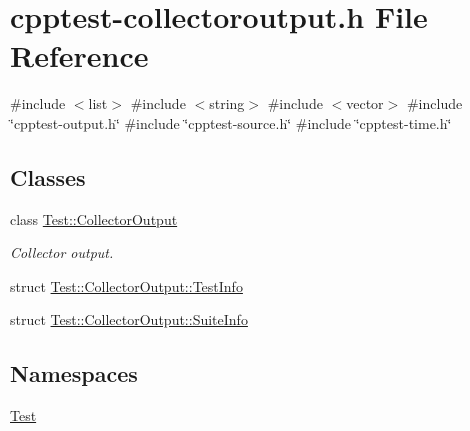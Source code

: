 \hypertarget{cpptest-collectoroutput_8h}{}\section{cpptest-\/collectoroutput.h File Reference}
\label{cpptest-collectoroutput_8h}
{\ttfamily \#include $<$list$>$}\newline
{\ttfamily \#include $<$string$>$}\newline
{\ttfamily \#include $<$vector$>$}\newline
{\ttfamily \#include \char`\"{}cpptest-\/output.\+h\char`\"{}}\newline
{\ttfamily \#include \char`\"{}cpptest-\/source.\+h\char`\"{}}\newline
{\ttfamily \#include \char`\"{}cpptest-\/time.\+h\char`\"{}}\newline
\subsection*{Classes}
\begin{DoxyCompactItemize}
\item 
class \mbox{\hyperlink{class_test_1_1_collector_output}{Test\+::\+Collector\+Output}}
\begin{DoxyCompactList}\small\item\em Collector output. \end{DoxyCompactList}\item 
struct \mbox{\hyperlink{struct_test_1_1_collector_output_1_1_test_info}{Test\+::\+Collector\+Output\+::\+Test\+Info}}
\item 
struct \mbox{\hyperlink{struct_test_1_1_collector_output_1_1_suite_info}{Test\+::\+Collector\+Output\+::\+Suite\+Info}}
\end{DoxyCompactItemize}
\subsection*{Namespaces}
\begin{DoxyCompactItemize}
\item 
 \mbox{\hyperlink{namespace_test}{Test}}
\end{DoxyCompactItemize}
